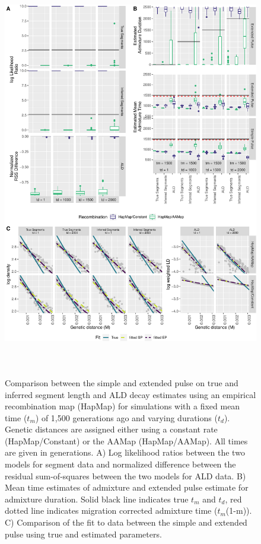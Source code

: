 \documentclass[11pt]{article}
\begin{document}
\begin{figure}
\centering
\includegraphics[width=16cm,height=18cm,keepaspectratio]{ATE_Revisions_files/figure-latex/figResult2_all_together_Supplements-1.pdf}
\caption{\label{fig:figResult2_sup} Comparison between the simple and extended pulse on true and inferred segment length and ALD decay estimates using an empirical recombination map (HapMap) for simulations with a fixed mean time ($t_m$) of 1,500 generations ago and varying durations ($t_d$). Genetic distances are assigned either using a constant rate (HapMap/Constant) or the AAMap (HapMap/AAMap). All times are given in generations. A) Log likelihood ratios between the two models for segment data and normalized difference between the residual sum-of-squares between the two models for ALD data. B) Mean time estimates of admixture and extended pulse estimate for admixture duration. Solid black line indicates true $t_m$ and $t_d$, red dotted line indicates migration corrected admixture time ($t_m$(1-m)). C) Comparison of the fit to data between the simple and extended pulse using true and estimated parameters. }
\end{figure}
\end{document}
